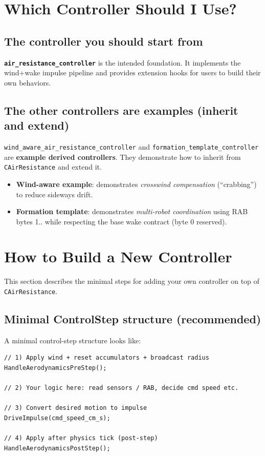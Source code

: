 \documentclass[11pt,a4paper]{article}
\begin{document}
\section{Which Controller Should I Use?}

\subsection{The controller you should start from}
\textbf{\texttt{air\_resistance\_controller}} is the intended foundation.
It implements the wind+wake impulse pipeline and provides extension hooks for users to build their own behaviors.

\subsection{The other controllers are examples (inherit and extend)}
\texttt{wind\_aware\_air\_resistance\_controller} and \texttt{formation\_template\_controller} are \textbf{example derived controllers}.
They demonstrate how to inherit from \texttt{CAirResistance} and extend it.

\begin{itemize}
  \item \textbf{Wind-aware example}: demonstrates \emph{crosswind compensation} (``crabbing'') to reduce sideways drift.
  \item \textbf{Formation template}: demonstrates \emph{multi-robot coordination} using RAB bytes 1.. while respecting the base wake contract (byte 0 reserved).
\end{itemize}

\section{How to Build a New Controller}
\label{sec:new-controller}

This section describes the minimal steps for adding your own controller on top of \texttt{CAirResistance}.

\subsection{Minimal ControlStep structure (recommended)}
A minimal control-step structure looks like:

\begin{lstlisting}
// 1) Apply wind + reset accumulators + broadcast radius
HandleAerodynamicsPreStep();

// 2) Your logic here: read sensors / RAB, decide cmd speed etc.

// 3) Convert desired motion to impulse
DriveImpulse(cmd_speed_cm_s);

// 4) Apply after physics tick (post-step)
HandleAerodynamicsPostStep();
\end{lstlisting}
\end{document}

